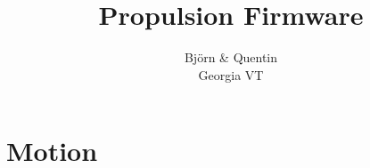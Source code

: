 \documentclass[]{article}
\title{Propulsion Firmware}
\author{Bj{\"o}rn \& Quentin\\Georgia VT}
\begin{document}
\maketitle
\section{Motion}
\end{document}
